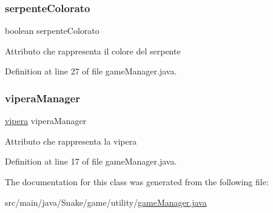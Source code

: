 \mbox{\label{class_snake_1_1game_1_1utility_1_1game_manager_a23cfb877f1f20af97a29e6f61424aa80}} 
\subsubsection{\texorpdfstring{serpente\+Colorato}{serpenteColorato}}
{\footnotesize\ttfamily boolean serpente\+Colorato\hspace{0.3cm}{\ttfamily [private]}}

Attributo che rappresenta il colore del serpente 

Definition at line 27 of file game\+Manager.\+java.

\mbox{\label{class_snake_1_1game_1_1utility_1_1game_manager_ad03d565374455808665272d6365c9bca}} 
\subsubsection{\texorpdfstring{vipera\+Manager}{viperaManager}}
{\footnotesize\ttfamily \mbox{\hyperlink{class_snake_1_1game_1_1vipera_1_1vipera}{vipera}} vipera\+Manager\hspace{0.3cm}{\ttfamily [private]}}

Attributo che rappresenta la vipera 

Definition at line 17 of file game\+Manager.\+java.



The documentation for this class was generated from the following file\+:\begin{DoxyCompactItemize}
\item 
src/main/java/\+Snake/game/utility/\mbox{\hyperlink{game_manager_8java}{game\+Manager.\+java}}\end{DoxyCompactItemize}
